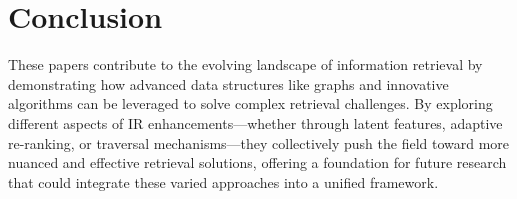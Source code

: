 \documentclass[sigconf,authorversion,nonacm]{acmart}
\begin{document}
\section{Conclusion}

These papers contribute to the evolving landscape of information retrieval by demonstrating how
advanced data structures like graphs and innovative algorithms can be leveraged to solve complex
retrieval challenges. By exploring different aspects of IR enhancements—whether through latent
features, adaptive re-ranking, or traversal mechanisms—they collectively push the field toward more
nuanced and effective retrieval solutions, offering a foundation for future research that could
integrate these varied approaches into a unified framework.

\section*{}


\end{document}

